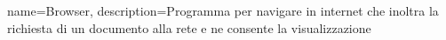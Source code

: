 {
    name=Browser,
    description={Programma per navigare in internet che inoltra la richiesta di un documento alla rete e ne consente la visualizzazione}
}